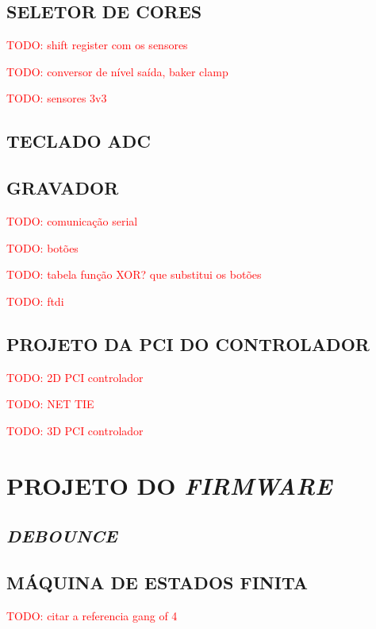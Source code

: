 \subsection{SELETOR DE CORES}
\label{subse:seletor}

\textcolor{red}{TODO: shift register com os sensores}

\textcolor{red}{TODO: conversor de nível saída, baker clamp}

\textcolor{red}{TODO: sensores 3v3}

\subsection{TECLADO ADC}
\label{subsec:tecladoadc}

\subsection{GRAVADOR}
\label{subsec:gravador}

\textcolor{red}{TODO: comunicação serial}

\textcolor{red}{TODO: botões}

\textcolor{red}{TODO: tabela função XOR? que substitui os botões}

\textcolor{red}{TODO: ftdi}

\subsection{PROJETO DA PCI DO CONTROLADOR}
\label{subsec:pcicontrol}

\textcolor{red}{TODO: 2D PCI controlador}

\textcolor{red}{TODO: NET TIE}

\textcolor{red}{TODO: 3D PCI controlador}

\section{PROJETO DO \emph{FIRMWARE}}
\label{sec:firmware}

\subsection{\emph{DEBOUNCE}}
\label{subsec:debounce}

\subsection{MÁQUINA DE ESTADOS FINITA}
\label{subsec:fsm}

\textcolor{red}{TODO: citar a referencia gang  of 4}

